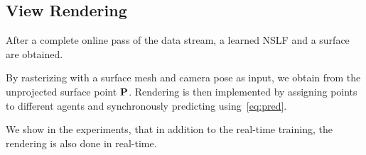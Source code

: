 \subsection{View Rendering}

After a complete online pass of the data stream, a learned NSLF and a surface are obtained.

By rasterizing with a surface mesh and camera pose as input, we obtain from the unprojected surface point $\mathbf P$.
%
Rendering is then implemented by assigning points to different agents and synchronously predicting using~\cref{eq:pred}.

We show in the experiments, that in addition to the real-time training, the rendering is also done in real-time.

